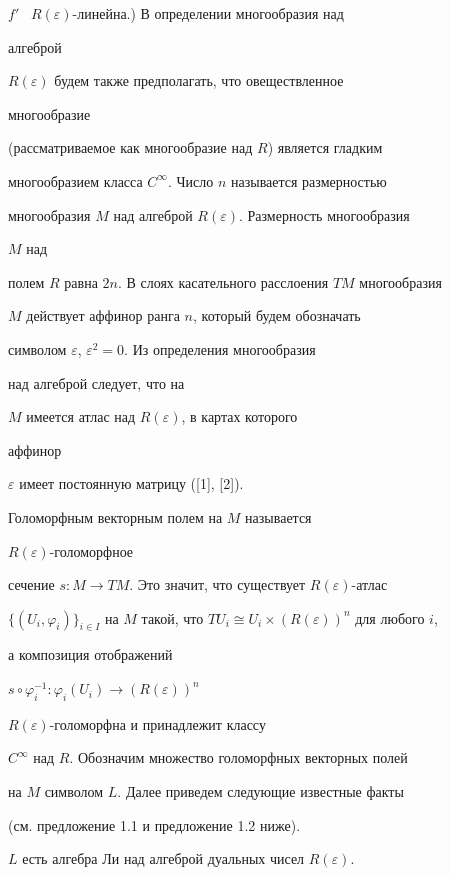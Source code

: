 $f'$ \ $R(\varepsilon)$-линейна.) В определении многообразия над 


алгеброй 


$R(\varepsilon)$ будем также предполагать, что овеществленное 


многообразие 


(рассматриваемое как многообразие над $R$) является гладким 


многообразием класса $C^\infty$. Число $n$ называется размерностью 


многообразия $M$ над алгеброй $R(\varepsilon)$. Размерность многообразия 


$M$ над 


полем $R$ равна $2n$. В слоях касательного расслоения $TM$ многообразия 


$M$ действует аффинор ранга $n$, который будем обозначать 


символом $\varepsilon$, $\varepsilon^2=0$. Из определения многообразия 


над алгеброй следует, что на 


$M$ имеется атлас над $R(\varepsilon)$, в картах которого 


аффинор 


$\varepsilon$ имеет постоянную матрицу ([1], [2]). 


 


Голоморфным векторным полем на $M$ называется 


$R(\varepsilon)$-голоморфное 


сечение $s:M\to TM$. Это значит, что существует $R(\varepsilon)$-атлас 


$\{(U_i,\varphi_i)\}_{i\in I}$ на $M$ такой, что $TU_i\cong


U_i\times(R(\varepsilon))^n$ для любого $i$, 


а композиция отображений 


$s\circ\varphi^{-1}_i:\varphi_i(U_i)\to (R(\varepsilon))^n$ \ 


$R(\varepsilon)$-голоморфна и принадлежит классу 


$C^\infty$ над $R$. Обозначим множество голоморфных векторных полей 


на $M$ символом $L$. Далее приведем следующие известные факты 


(см. предложение 1.1 и предложение 1.2 ниже). 


 


\begin{props} 


$L$ есть алгебра Ли над алгеброй дуальных чисел $R(\varepsilon)$. 


\end{props} 


